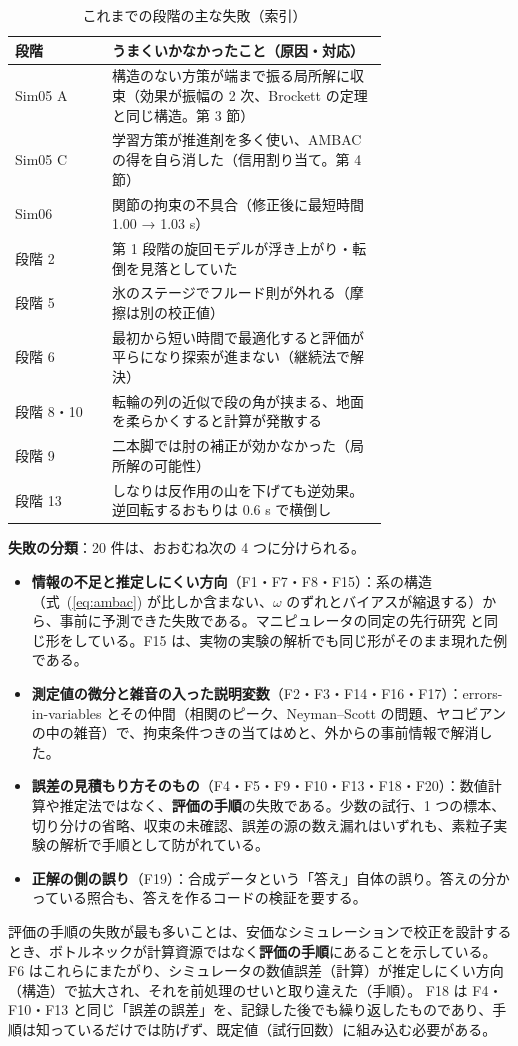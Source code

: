\documentclass[paper=a4paper,fontsize=10pt,twocolumn,column_gap=2zw,line_length=24zw,number_of_lines=46,head_space=20mm]{jlreq}
\begin{document}
\begin{table}[t]\centering\footnotesize
\caption{これまでの段階の主な失敗（索引）}\label{tab:failidx}
\setlength{\tabcolsep}{2pt}
\begin{tabular}{lp{0.74\linewidth}}\toprule
段階 & うまくいかなかったこと（原因・対応） \\\midrule
Sim05 A & 構造のない方策が端まで振る局所解に収束（効果が振幅の 2 次、Brockett の定理と同じ構造。第 3 節） \\
Sim05 C & 学習方策が推進剤を多く使い、AMBAC の得を自ら消した（信用割り当て。第 4 節） \\
Sim06 & 関節の拘束の不具合（修正後に最短時間 1.00 → 1.03 s） \\
段階 2 & 第 1 段階の旋回モデルが浮き上がり・転倒を見落としていた \\
段階 5 & 氷のステージでフルード則が外れる（摩擦は別の校正値） \\
段階 6 & 最初から短い時間で最適化すると評価が平らになり探索が進まない（継続法で解決） \\
段階 8・10 & 転輪の列の近似で段の角が挟まる、地面を柔らかくすると計算が発散する \\
段階 9 & 二本脚では肘の補正が効かなかった（局所解の可能性） \\
段階 13 & しなりは反作用の山を下げても逆効果。逆回転するおもりは 0.6 s で横倒し \\\bottomrule
\end{tabular}
\end{table}

\textbf{失敗の分類}：20 件は、おおむね次の 4 つに分けられる。
\begin{itemize}\setlength{\itemsep}{0pt}
\item \textbf{情報の不足と推定しにくい方向}（F1・F7・F8・F15）：系の構造（式~(\ref{eq:ambac}) が比しか含まない、$\omega$ のずれとバイアスが縮退する）から、事前に予測できた失敗である。マニピュレータの同定の先行研究 \cite{gautier1990} と同じ形をしている。F15 は、実物の実験の解析でも同じ形がそのまま現れた例である。
\item \textbf{測定値の微分と雑音の入った説明変数}（F2・F3・F14・F16・F17）：errors-in-variables とその仲間（相関のピーク、Neyman--Scott の問題、ヤコビアンの中の雑音）で、拘束条件つきの当てはめと、外からの事前情報で解消した。
\item \textbf{誤差の見積もり方そのもの}（F4・F5・F9・F10・F13・F18・F20）：数値計算や推定法ではなく、\textbf{評価の手順}の失敗である。少数の試行、1 つの標本、切り分けの省略、収束の未確認、誤差の源の数え漏れはいずれも、素粒子実験の解析で手順として防がれている。
\item \textbf{正解の側の誤り}（F19）：合成データという「答え」自体の誤り。答えの分かっている照合も、答えを作るコードの検証を要する。
\end{itemize}
評価の手順の失敗が最も多いことは、安価なシミュレーションで校正を設計するとき、ボトルネックが計算資源ではなく\textbf{評価の手順}にあることを示している。
F6 はこれらにまたがり、シミュレータの数値誤差（計算）が推定しにくい方向（構造）で拡大され、それを前処理のせいと取り違えた（手順）。
F18 は F4・F10・F13 と同じ「誤差の誤差」を、記録した後でも繰り返したものであり、手順は知っているだけでは防げず、既定値（試行回数）に組み込む必要がある。
\end{document}
